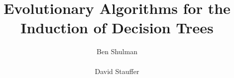 \documentclass{acm_proc_article-sp}
\begin{document}
\title{Evolutionary Algorithms for the Induction of Decision Trees}
%
%
%
%
%

%
\author{
%
%
\alignauthor
Ben Shulman\\
       \\
\alignauthor
David Stauffer\\
       \\
}
\end{document}
